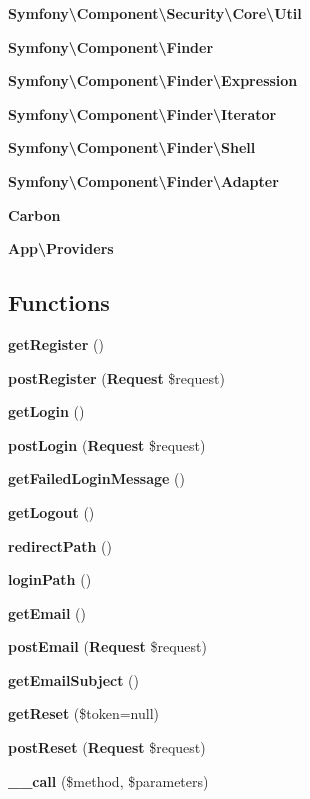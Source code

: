 \begin{DoxyCompactItemize}
 {\bf Symfony\textbackslash{}\+Component\textbackslash{}\+Security\textbackslash{}\+Core\textbackslash{}\+Util}
\item 
 {\bf Symfony\textbackslash{}\+Component\textbackslash{}\+Finder}
\item 
 {\bf Symfony\textbackslash{}\+Component\textbackslash{}\+Finder\textbackslash{}\+Expression}
\item 
 {\bf Symfony\textbackslash{}\+Component\textbackslash{}\+Finder\textbackslash{}\+Iterator}
\item 
 {\bf Symfony\textbackslash{}\+Component\textbackslash{}\+Finder\textbackslash{}\+Shell}
\item 
 {\bf Symfony\textbackslash{}\+Component\textbackslash{}\+Finder\textbackslash{}\+Adapter}
\item 
 {\bf Carbon}
\item 
 {\bf App\textbackslash{}\+Providers}
\end{DoxyCompactItemize}
\subsection*{Functions}
\begin{DoxyCompactItemize}
\item 
{\bf get\+Register} ()
\item 
{\bf post\+Register} ({\bf Request} \$request)
\item 
{\bf get\+Login} ()
\item 
{\bf post\+Login} ({\bf Request} \$request)
\item 
{\bf get\+Failed\+Login\+Message} ()
\item 
{\bf get\+Logout} ()
\item 
{\bf redirect\+Path} ()
\item 
{\bf login\+Path} ()
\item 
{\bf get\+Email} ()
\item 
{\bf post\+Email} ({\bf Request} \$request)
\item 
{\bf get\+Email\+Subject} ()
\item 
{\bf get\+Reset} (\$token=null)
\item 
{\bf post\+Reset} ({\bf Request} \$request)
\item 
{\bf \+\_\+\+\_\+call} (\$method, \$parameters)
\end{DoxyCompactItemize}
